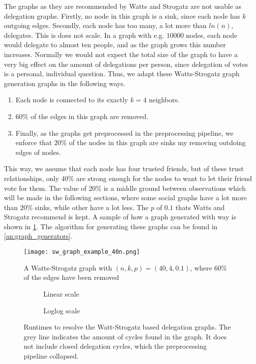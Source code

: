 The graphs as they are recommended by Watts and Strogatz are not usable as delegation graphs. Firstly, no node in this graph is a sink, since each node has $k$ outgoing edges. Secondly, each node has too many, a lot more than $ln(n)$, delegates. This is does not scale. In a graph with e.g. $10 000$ nodes, each node would delegate to almost ten people, and as the graph grows this number increases. Normally we would not expect the total size of the graph to have a very big effect on the amount of delegations per person, since delegation of votes is a personal, individual question. Thus, we adapt these Watts-Strogatz graph generation graphs in the following ways.

\begin{enumerate}
\item Each node is connected to its exactly $k=4$ neighbors. 
\item $60\%$ of the edges in this graph are removed. 
\item Finally, as the graphs get preprocessed in the preprocessing pipeline, we enforce that $20\%$ of the nodes in this graph are sinks my removing outdoing edges of nodes.  
\end{enumerate}

This way, we assume that each node has four trusted friends, but of these trust relationships, only $40\%$ are strong enough for the nodes to want to let their friend vote for them. The value of $20\%$ is a middle ground between observations which will be made in the following sections, where some social graphs have a lot more than $20\%$ sinks, while other have a lot less. The $p$ of $0.1$ thats Watts and Strogatz recommend is kept. A sample of how a graph generated with way is shown in \cref{fig:ws_example}. The algorithm for generating these graphs can be found in \cref{an:graph_generators}.

\begin{figure}
\centering
\texttt{[image: sw\_graph\_example\_40n.png]}
\caption{A Watts-Strogatz graph with $(n, k, p) = (40, 4, 0.1)$, where $60\%$ of the edges have been removed}
\label{fig:ws_example}
\end{figure}

\begin{figure}[t]
    \centering
    \begin{subfigure}[t]{0.45\textwidth}
        \centering
        \caption{Linear scale}
        \label{subfig:sw_linear}
    \end{subfigure}
    \hfill
    \begin{subfigure}[t]{0.45\textwidth}
        \centering
        \caption{Loglog scale}
        \label{subfig:sw_loglog}
    \end{subfigure}
    \caption{Runtimes to resolve the Watt-Strogatz based delegation graphs. The grey line indicates the amount of cycles found in the graph. It does not include closed delegation cycles, which the preprocessing pipeline collapsed.}
    \label{fig:sw}
\end{figure}




